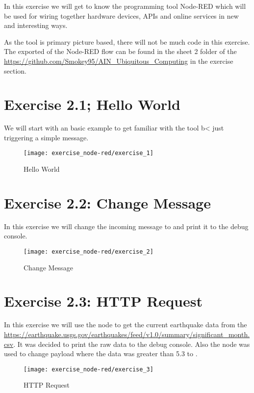 
In this exercise we will get to know the programming tool Node-RED which will be used 
for wiring together hardware devices, APIs and online services in new and interesting ways.

As the tool is primary picture based, there will not be much code in this exercise.
The exported  of the Node-RED flow can be found in the sheet 2 folder of the 
\url{https://github.com/Smokey95/AIN_Ubiquitous_Computing} in the exercise section.


\section{Exercise 2.1; Hello World}

We will start with an basic example to get familiar with the tool b< just triggering a 
simple  message.

\begin{figure}[h!]
  \centering
  \texttt{[image: exercise\_node-red/exercise\_1]}
  \caption{Hello World}
  \label{fig:hello_world}
\end{figure}


\section{Exercise 2.2: Change Message}

In this exercise we will change the incoming  message to  and 
print it to the debug console.

\begin{figure}[h!]
  \centering
  \texttt{[image: exercise\_node-red/exercise\_2]}
  \caption{Change Message}
  \label{fig:change_message}
\end{figure}


\section{Exercise 2.3: HTTP Request}

In this exercise we will use the  node to get the current earthquake data from 
the \url{https://earthquake.usgs.gov/earthquakes/feed/v1.0/summary/significant_month.csv}.
It was decided to print the raw data to the debug console. Also the  node was used to 
change payload where the  data was greater than 5.3 to .

\begin{figure}[h!]
  \centering
  \texttt{[image: exercise\_node-red/exercise\_3]}
  \caption{HTTP Request}
  \label{fig:http_request}
\end{figure}



